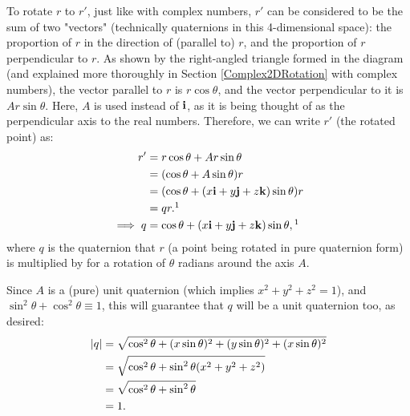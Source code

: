 \documentclass[10pt]{article}
\begin{document}
To rotate $r$ to $r'$, just like with complex numbers, $r'$ can be considered to be the sum of two "vectors" (technically quaternions in this 4-dimensional space): the proportion of $r$ in the direction of (parallel to) $r$, and the proportion of $r$ perpendicular to $r$. As shown by the right-angled triangle formed in the diagram (and explained more thoroughly in Section \ref{Complex2DRotation} with complex numbers), the vector parallel to $r$ is $r\cos\theta$, and the vector perpendicular to it is $Ar\sin\theta$. Here, $A$ is used instead of $\vb{i}$, as it is being thought of as the perpendicular axis to the real numbers. Therefore, we can write $r'$ (the rotated point) as:
\begin{equation}
    \begin{aligned}
        r' &= r\cos\theta + Ar\sin\theta \\
           &= (\cos\theta + A\sin\theta)r \\
           &= (\cos\theta + (x\vb{i} + y\vb{j} + z\vb{k})\sin\theta)r \\
           &= qr. \footnotemark[1] \\
        \implies q &= \cos\theta + (x\vb{i} + y\vb{j} + z\vb{k})\sin\theta,\footnotemark[1]
    \end{aligned}
\end{equation}
where $q$ is the quaternion that $r$ (a point being rotated in pure quaternion form) is multiplied by for a rotation of $\theta$ radians around the axis $A$.

Since $A$ is a (pure) unit quaternion (which implies $x^2 + y^2 + z^2 = 1$), and $\sin^2\theta + \cos^2\theta \equiv 1$, this will guarantee that $q$ will be a unit quaternion too, as desired:
\begin{equation}
    \begin{aligned}
        \abs{q} &= \sqrt{\cos^2\theta + (x\sin\theta)^2 + (y\sin\theta)^2 + (x\sin\theta)^2} \\
                &= \sqrt{\cos^2\theta + \sin^2\theta(x^2 + y^2 + z^2)} \\
                &= \sqrt{\cos^2\theta + \sin^2\theta} \\
                &= 1.
    \end{aligned}
\end{equation}
\end{document}
